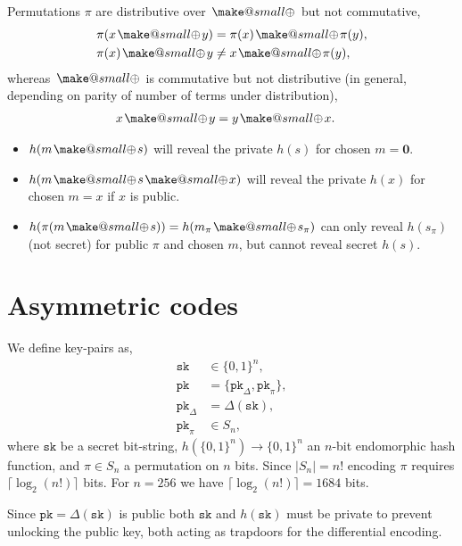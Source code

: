\documentclass[twocolumn, aps, amsmath, amssymb, nofootinbib, superscriptaddress, longbibliography, doublefloatfix, table-of-contents, eqsecnum, rmp]{revtex4-2}
\makeatletter
\newcommand{\soplus}{{{\hspace{1pt}}{\mathbin{\mathpalette\make@small{\mathbin\oplus}}}}{\hspace{1pt}}}
\newcommand{\make@small}[2]{%
  \vcenter{\hbox{%
    \scalebox{0.6}{$\m@th#1#2$}%
  }}%
}
\makeatother
\begin{document}
Permutations $\pi$ are distributive over $\soplus$ but not commutative,
\begin{align}
	\pi(x\soplus y) &= \pi(x) \soplus \pi(y),\nonumber\\
	\pi(x) \soplus y &\neq x \soplus \pi(y),
\end{align}
whereas $\soplus$ is commutative but not distributive (in general, depending on parity of number of terms under distribution),
\begin{align}
	x\soplus y &= y \soplus x.
\end{align}

\begin{itemize}
	\item $h(m\soplus s)$ will reveal the private $h(s)$ for chosen $m=\mathbf{0}$.
	\item $h(m\soplus s \soplus x)$ will reveal the private $h(x)$ for chosen $m=x$ if $x$ is public.
	\item $h(\pi(m\soplus s)) = h(m_\pi \soplus s_\pi)$ can only reveal $h(s_\pi)$ (not secret) for public $\pi$ and chosen $m$, but cannot reveal secret $h(s)$.
\end{itemize}

\section{Asymmetric codes}

We define key-pairs as,
\begin{align}
	\mathtt{sk} &\in \{0,1\}^n, \nonumber\\
	\mathtt{pk} &= \{\mathtt{pk}_\Delta,\mathtt{pk}_\pi\},\nonumber\\
	\mathtt{pk}_\Delta &= \Delta(\mathtt{sk}),\nonumber\\
	\mathtt{pk}_\pi &\in S_n,
\end{align}
where $\mathtt{sk}$ be a secret bit-string, $h(\{0,1\}^n)\to\{0,1\}^n$ an $n$-bit endomorphic hash function, and $\pi\in S_n$ a permutation on $n$ bits. Since $|S_n|=n!$ encoding $\pi$ requires $\lceil\log_2(n!)\rceil$ bits. For $n=256$ we have $\lceil\log_2(n!)\rceil = 1684$ bits.

Since $\mathtt{pk} = \Delta(\mathtt{sk})$ is public both $\mathtt{sk}$ and $h(\mathtt{sk})$ must be private to prevent unlocking the public key, both acting as trapdoors for the differential encoding.
\end{document}
